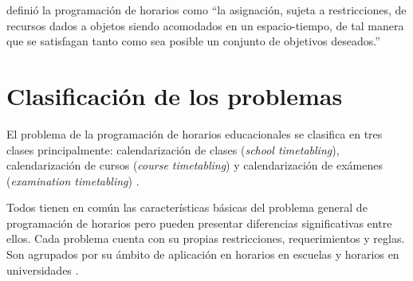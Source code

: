 \documentclass[draft,12pt,headsepline,footsepline,paper=letter]{scrreprt}
\begin{document}
\citet[p.~53]{wren95scheduling-timetabling} definió la programación de horarios como “la asignación, sujeta a restricciones, de recursos dados a objetos siendo acomodados en un espacio-tiempo, de tal manera que se satisfagan tanto como sea posible un conjunto de objetivos deseados.”

\section{Clasificación de los problemas}
\label{sec:clasificacion_problemas}

El problema de la programación de horarios educacionales se clasifica en tres clases principalmente:
calendarización de clases (\textit{school timetabling}),
calendarización de cursos (\textit{course timetabling}) y
calendarización de exámenes (\textit{examination timetabling}) \citep[p.~88]{schaerf99a-survey-of-automated}.

Todos tienen en común las características básicas del problema general de programación de horarios pero pueden presentar diferencias significativas entre ellos. Cada problema cuenta con su propias restricciones, requerimientos y reglas. Son agrupados por su ámbito de aplicación en horarios en escuelas y horarios en universidades \citep[p.~10]{abdullah06heuristic-approaches}.
\end{document}
